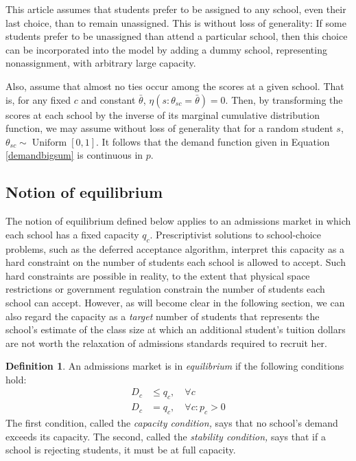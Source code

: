 \documentclass[12pt]{article}
\numberwithin{equation}{subsection}
\theoremstyle{definition}
\newtheorem{definition}{Definition}
\begin{document}
This article assumes that students prefer to be assigned to any school, even their last choice, than to remain unassigned. This is without loss of generality: If some students prefer to be unassigned than attend a particular school, then this choice can be incorporated into the model by adding a dummy school, representing nonassignment, with arbitrary large capacity.

Also, assume that almost no ties occur among the scores at a given school. That is, for any fixed $c$ and constant $\bar \theta$, $\eta( s: \theta_{sc} = \bar \theta) = 0$. Then, by transforming the scores at each school by the inverse of its marginal cumulative distribution function, we may assume without loss of generality that for a random student $s$, $\theta_{sc} \sim \operatorname{Uniform}[0, 1]$. It follows that the demand function given in Equation \eqref{demandbigsum} is continuous in $p$. 

\subsection{Notion of equilibrium}
The notion of equilibrium defined below applies to an admissions market in which each school has a fixed capacity $q_c$. Prescriptivist solutions to school-choice problems, such as the deferred acceptance algorithm, interpret this capacity as a hard constraint on the number of students each school is allowed to accept. Such hard constraints are possible in reality, to the extent that physical space restrictions or government regulation constrain the number of students each school can accept. However, as will become clear in the following section, we can also regard the capacity as a \emph{target} number of students that represents the school's estimate of the class size at which an additional student's tuition dollars are not worth the relaxation of admissions standards required to recruit her.

\begin{definition} \label{marketeqconditions} An admissions market is in \emph{equilibrium} if the following conditions hold:
\begin{align} D_c &\leq q_c, \quad \forall c \label{capacitycondition} \\
D_c &= q_c, \quad \forall c: p_c > 0 \label{stabilitycondition}
\end{align}
The first condition, called the \emph{capacity condition,} says that no school's demand exceeds its capacity. The second, called the \emph{stability condition,} says that if a school is rejecting students, it must be at full capacity.
\end{definition}
\end{document}
